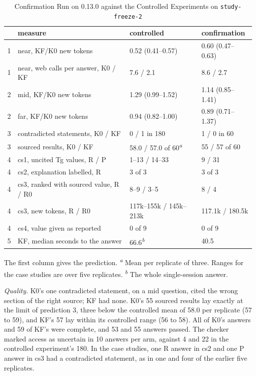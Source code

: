 \documentclass[journal=mamobx,manuscript=suppinfo]{achemso}
\newcommand{\code}[1]{\texttt{#1}}
\begin{document}
\begin{table}
  \caption{Confirmation Run on 0.13.0 against the Controlled Experiments on \code{study-freeze-2}}
  \label{tbl:confirm}
  \small
  \begin{tabular}{clll}
    \toprule
    & measure & controlled & confirmation \\
    \midrule
    1 & near, KF/K0 new tokens & 0.52 (0.41--0.57) & 0.60 (0.47--0.63) \\
    1 & near, web calls per answer, K0 / KF & 7.6 / 2.1 & 8.6 / 2.7 \\
    2 & mid, KF/K0 new tokens & 1.29 (0.99--1.52) & 1.14 (0.85--1.41) \\
    2 & far, KF/K0 new tokens & 0.94 (0.82--1.00) & 0.89 (0.71--1.37) \\
    3 & contradicted statements, K0 / KF & 0 / 1 in 180 & 1 / 0 in 60 \\
    3 & sourced results, K0 / KF & 58.0 / 57.0 of 60\textsuperscript{\emph{a}} & 55 / 57 of 60 \\
    4 & cs1, uncited Tg values, R / P & 1--13 / 14--33 & 9 / 31 \\
    4 & cs2, explanation labelled, R & 3 of 3 & 3 of 3 \\
    4 & cs3, ranked with sourced value, R / R0 & 8--9 / 3--5 & 8 / 4 \\
    4 & cs3, new tokens, R / R0 & 117k--155k / 145k--213k & 117.1k / 180.5k \\
    4 & cs4, value given as reported & 0 of 9 & 0 of 9 \\
    5 & KF, median seconds to the answer & 66.6\textsuperscript{\emph{b}} & 40.5 \\
    \bottomrule
  \end{tabular}

  The first column gives the prediction. \textsuperscript{\emph{a}} Mean per replicate of three. Ranges for the case studies are over five replicates. \textsuperscript{\emph{b}} The whole single-session answer.
\end{table}

\emph{Quality.}
K0's one contradicted statement, on a mid question, cited the wrong section of the right source; KF had none.
K0's 55 sourced results lay exactly at the limit of prediction 3, three below the controlled mean of 58.0 per replicate (57 to 59), and KF's 57 lay within its controlled range (56 to 58).
All of K0's answers and 59 of KF's were complete, and 53 and 55 answers passed.
The checker marked access as uncertain in 10 answers per arm, against 4 and 22 in the controlled experiment's 180.
In the case studies, one R answer in cs2 and one P answer in cs3 had a contradicted statement, as in one and four of the earlier five replicates.
\end{document}
